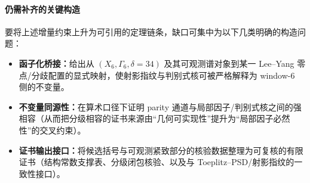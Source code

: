 \begin{remark}
\paragraph{仍需补齐的关键构造}
要将上述增量约束上升为可引用的定理链条，缺口可集中为以下几类明确的构造问题：
\begin{itemize}
  \item \textbf{函子化桥接：}给出从 \((X_6,\Gamma_6,\delta=34)\) 及其可观测谱对象到某一 Lee--Yang 零点/分歧配置的显式映射，使射影指纹与判别式核可被严格解释为 window-\(6\) 侧的不变量。
  \item \textbf{不变量同源性：}在算术口径下证明 parity 通道与局部因子/判别式核之间的强相容（从而把分级相容的证书来源由“几何可实现性”提升为“局部因子必然性”的交叉约束）。
  \item \textbf{证书输出接口：}将候选括号与可观测紧致部分的核验数据整理为可复核的有限证书（结构常数支撑表、分级闭包核验、以及与 Toeplitz--PSD/射影指纹的一致性接口）。
\end{itemize}
\end{remark}
